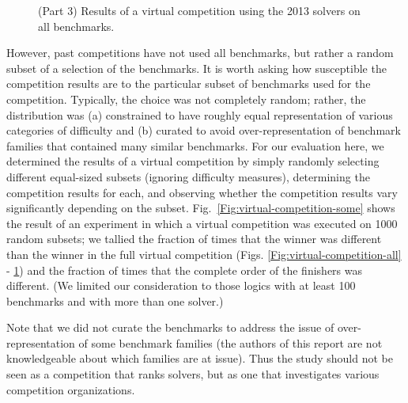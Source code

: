 \documentclass[smallcondensed]{svjour3}
\begin{document}
\begin{figure}
\centering
\begin{tabular}{|p{.1in}rrl|}
\hline

\end{tabular}
\caption{(Part 3) Results of a virtual competition using the 2013 solvers on all benchmarks.}
\label{Fig:virtual-competition-all3}
\end{figure}

However, past competitions have not used all benchmarks, but rather a random subset of a selection of the benchmarks. It is worth asking how susceptible the competition results are to the particular subset of benchmarks used for the competition. Typically, the choice was not completely random; rather, the distribution was (a) constrained to have roughly equal representation of various categories of difficulty and (b) curated to avoid over-representation of benchmark families that contained many similar benchmarks. For our evaluation here, we determined the results of a virtual competition by simply randomly selecting different equal-sized subsets (ignoring difficulty measures), determining the competition results for each, and observing whether the competition results vary significantly depending on the subset.  Fig.~\ref{Fig:virtual-competition-some} shows the result of an experiment in which a virtual competition was executed on 1000 random subsets; we tallied the fraction of times that the winner was different than the winner in the full virtual competition (Figs. \ref{Fig:virtual-competition-all} - \ref{Fig:virtual-competition-all3}) and the fraction of times that the complete order of the finishers was different. (We limited our consideration to those logics with at least 100 benchmarks and with more than one solver.)

Note that we did not curate the benchmarks to address the issue of over-representation of some benchmark families (the authors of this report are not knowledgeable about which families are at issue).  Thus the study should not be seen as a competition that ranks solvers, but as one that investigates various competition organizations.
\end{document}
